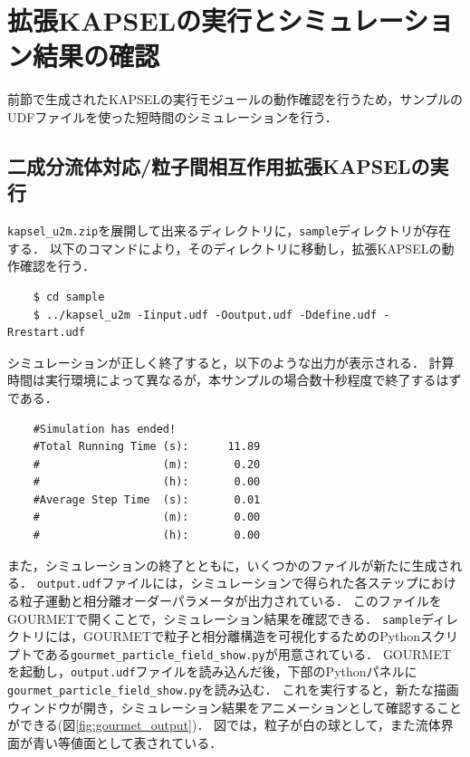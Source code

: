 \documentclass[pdflatex,a4paper,10pt,ja=standard]{bxjsarticle}
\begin{document}
\section{拡張KAPSELの実行とシミュレーション結果の確認}
\label{sec:kapsel_sample}
前節で生成されたKAPSELの実行モジュールの動作確認を行うため，サンプルのUDFファイルを使った短時間のシミュレーションを行う．

\subsection{二成分流体対応/粒子間相互作用拡張KAPSELの実行}

\verb|kapsel_u2m.zip|を展開して出来るディレクトリに，\verb|sample|ディレクトリが存在する．
以下のコマンドにより，そのディレクトリに移動し，拡張KAPSELの動作確認を行う．
\begin{verbatim}
    $ cd sample
    $ ../kapsel_u2m -Iinput.udf -Ooutput.udf -Ddefine.udf -Rrestart.udf
\end{verbatim}
シミュレーションが正しく終了すると，以下のような出力が表示される．
計算時間は実行環境によって異なるが，本サンプルの場合数十秒程度で終了するはずである．
\begin{verbatim}
    #Simulation has ended!
    #Total Running Time (s):      11.89
    #                   (m):       0.20
    #                   (h):       0.00
    #Average Step Time  (s):       0.01
    #                   (m):       0.00
    #                   (h):       0.00
\end{verbatim}
また，シミュレーションの終了とともに，いくつかのファイルが新たに生成される．
\verb|output.udf|ファイルには，シミュレーションで得られた各ステップにおける粒子運動と相分離オーダーパラメータが出力されている．
このファイルをGOURMETで開くことで，シミュレーション結果を確認できる．
\verb|sample|ディレクトリには，GOURMETで粒子と相分離構造を可視化するためのPythonスクリプトである\verb|gourmet_particle_field_show.py|が用意されている．
GOURMETを起動し，\verb|output.udf|ファイルを読み込んだ後，下部のPythonパネルに\verb|gourmet_particle_field_show.py|を読み込む．
これを実行すると，新たな描画ウィンドウが開き，シミュレーション結果をアニメーションとして確認することができる(図\ref{fig:gourmet_output})．
図では，粒子が白の球として，また流体界面が青い等値面として表されている．
\end{document}
